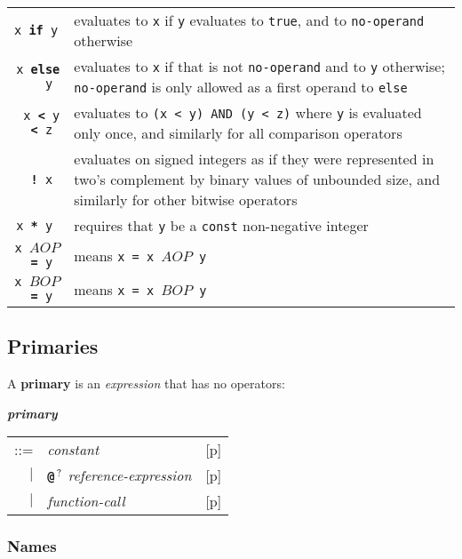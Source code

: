 \documentclass[12pt]{article}
\newcommand{\TT}[1]{{\tt \bfseries #1}}
\newcommand{\QMARK}{{$^{\,\mbox{\footnotesize ?}}$}}
\newcommand{\key}[1]{{\rm \bfseries #1}}
\newcommand{\emkey}[1]{{\em \bfseries #1}}
\newcommand{\pagref}[1]{p\pageref{#1}}
\newenvironment{indpar}[1][0.3in]%
	{\begin{list}{}%
		     {\setlength{\itemsep}{0in}%
		      \setlength{\topsep}{0in}%
		      \setlength{\parsep}{1ex}%
		      \setlength{\labelwidth}{#1}%
		      \setlength{\leftmargin}{#1}%
		      \addtolength{\leftmargin}{\labelsep}}%
	 \item}%
	{\end{list}}
\begin{document}
\begin{indpar}
\begin{tabular}{rp{5.0in}}
\tt x \TT{if} y & evaluates to {\tt x} if {\tt y} evaluates to {\tt true},
                  and to {\tt no-operand} otherwise
\\[0.5ex]
\tt x \TT{else} y & evaluates to {\tt x} if that is not {\tt no-operand}
                  and to {\tt y} otherwise; {\tt no-operand} is only
		  allowed as a first operand to {\tt else}
\\[0.5ex]
\tt x \TT{<} y \TT{<} z & evaluates to {\tt (x < y) AND (y < z)} where
                  {\tt y} is evaluated only once, and similarly for
		  all comparison operators
\\[0.5ex]
\tt \TT{!} x & evaluates on signed integers as if they were represented
               in two's complement by binary values of unbounded size,
	       and similarly for other bitwise operators
\\[0.5ex]
\tt x \TT{**} y & requires that {\tt y} be a {\tt const} non-negative integer
\\[0.5ex]
\tt x $AOP$\TT{=} y & means {\tt x = x $AOP$ y}
\\[0.5ex]
\tt x $BOP$\TT{=} y & means {\tt x = x $BOP$ y}
\end{tabular}
\end{indpar}

\subsection{Primaries}

A \key{primary} is an {\em expression} that has no operators:
\begin{indpar}
\emkey{primary}
    \begin{tabular}[t]{@{}rll}
    ::= & {\em constant}		& [\pagref{CONSTANTS}] \\
    $|$ & \TT{@}\QMARK{} {\em reference-expression}
                                        & [\pagref{REFERENCE-EXPRESSIONS}] \\
    $|$ & {\em function-call}		& [\pagref{FUNCTION-CALLS}] \\
    \end{tabular}
\end{indpar}

\subsubsection{Names}
\label{NAMES}
\end{document}
